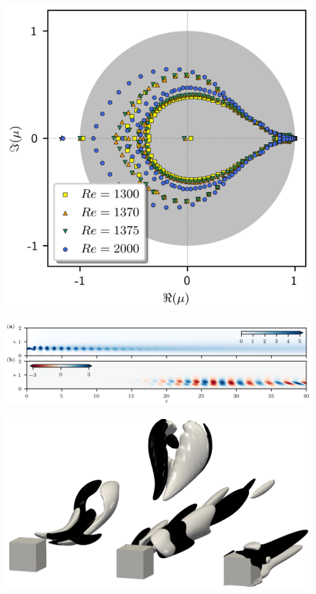 \documentclass[aspectratio=169, usenames, dvipsnames]{beamer}
\begin{document}
{

  \begin{frame}
    \vfill
    \begin{minipage}{.28\textwidth}
      \includegraphics[width=\textwidth]{fig13}
    \end{minipage}%
    \hfill
    \begin{minipage}{.68\textwidth}
      \includegraphics[width=\textwidth]{fig12}
    \end{minipage}
    \vfill
  \end{frame}

  \begin{frame}
    \vfill
    \centering
    \includegraphics[width=.9\textwidth]{cube_bifurcations}
    \vfill
  \end{frame}
}
\end{document}
